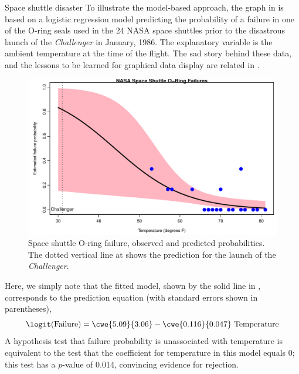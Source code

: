 \documentclass[11pt]{book}\usepackage[]{graphicx}\usepackage[]{color}
\newenvironment{knitrout}{}{} %
\renewenvironment{knitrout}{\small\renewcommand{\baselinestretch}{.85}}{} %
\begin{document}
\begin{Example}[nasa0]{Space shuttle disaster}
To illustrate the model-based approach,
the graph in  is based on
a logistic regression model predicting the probability of a
failure in one of the O-ring seals used in the 24 NASA space shuttles
prior to the disastrous launch of the 
\emph{Challenger} in January, 1986.  The explanatory variable is the ambient temperature at the time of the flight.
The sad story behind these data, and the lessons to be learned for
graphical data display are related in .

\begin{knitrout}
\color{fgcolor}\begin{figure}[htbp]


\centerline{\includegraphics[width=.7\textwidth]{ch01/fig/spaceshuttle0} }

\caption[Space shuttle O-ring failure, observed and predicted probabilities]{Space shuttle O-ring failure, observed and predicted probabilities. The dotted vertical line at  shows the prediction for the launch of the \emph{Challenger}.\label{fig:spaceshuttle0}}
\end{figure}


\end{knitrout}


Here, we simply note that the fitted model, shown by the solid line in
, corresponds to the prediction equation
(with standard errors shown in parentheses),
\begin{equation*}
 \logit ( \mbox{Failure} ) =  \cwe{5.09}{3.06} - \cwe{0.116}{0.047} \mbox{ Temperature} 
 \end{equation*}%
A hypothesis test that failure probability is unassociated with temperature
is equivalent to the test that the coefficient for temperature in this
model equals 0; this test has a $p$-value of 0.014, convincing evidence
for rejection.


\end{Example}
\end{document}
